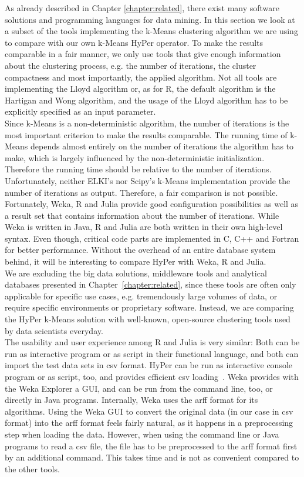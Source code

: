 As already described in Chapter \ref{chapter:related}, there exist many software solutions and programming languages for data mining. In this section we look at a subset of the tools implementing the k-Means clustering algorithm we are using to compare with our own k-Means HyPer operator. To make the results comparable in a fair manner, we only use tools that give enough information about the clustering process, e.g. the number of iterations, the cluster compactness and most importantly, the applied algorithm. Not all tools are implementing the Lloyd algorithm or, as for R, the default algorithm is the Hartigan and Wong algorithm, and the usage of the Lloyd algorithm has to be explicitly specified as an input parameter.
\\
Since k-Means is a non-deterministic algorithm, the number of iterations is the most important criterion to make the results comparable. The running time of k-Means depends almost entirely on the number of iterations the algorithm has to make, which is largely influenced by the non-deterministic initialization. Therefore the running time should be relative to the number of iterations. Unfortunately, neither ELKI's nor Scipy's k-Means implementation provide the number of iterations as output. Therefore, a fair comparison is not possible. Fortunately, Weka, R and Julia provide good configuration possibilities as well as a result set that contains information about the number of iterations. While Weka is written in Java, R and Julia are both written in their own high-level syntax. Even though, critical code parts are implemented in C, C++ and Fortran for better performance. Without the overhead of an entire database system behind, it will be interesting to compare HyPer with Weka, R and Julia.
\\
We are excluding the big data solutions, middleware tools and analytical databases presented in Chapter~\ref{chapter:related}, since these tools are often only applicable for specific use cases, e.g. tremendously large volumes of data, or require specific environments or proprietary software. Instead, we are comparing the HyPer k-Means solution with well-known, open-source clustering tools used by data scientists everyday.
\\
The usability and user experience among R and Julia is very similar: Both can be run as interactive program or as script in their functional language, and both can import the test data sets in csv format. HyPer can be run as interactive console program or as script, too, and provides efficient csv loading~\parencite{hypercsv}. Weka provides with the Weka Explorer a GUI, and can be run from the command line, too, or directly in Java programs. Internally, Weka uses the arff format for its algorithms. Using the Weka GUI to convert the original data (in our case in csv format) into the arff format feels fairly natural, as it happens in a preprocessing step when loading the data. However, when using the command line or Java programs to read a csv file, the file has to be preprocessed to the arff format first by an additional command. This takes time and is not as convenient compared to the other tools.
